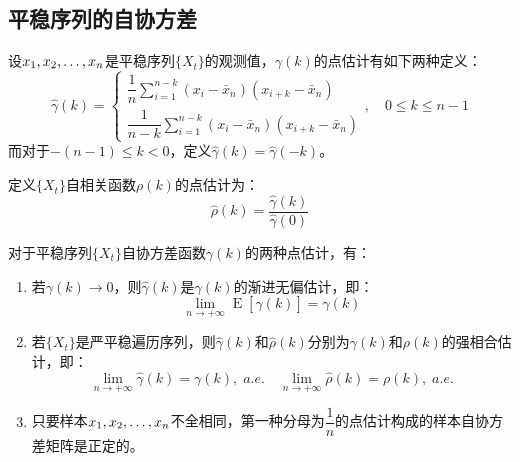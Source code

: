 \subsection{平稳序列的自协方差}
\begin{definition}
	设$x_1, x_2, \dots, x_{n}$是平稳序列$\{X_t\}$的观测值，$\gamma(k)$的点估计有如下两种定义：
	\begin{equation*}
		\hat{\gamma}(k)=
		\begin{cases}
			\dfrac{1}{n}\sum\limits_{i=1}^{n-k}(x_i-\bar{x}_n)(x_{i+k}-\bar{x}_n) \\
			\dfrac{1}{n-k}\sum\limits_{i=1}^{n-k}(x_i-\bar{x}_n)(x_{i+k}-\bar{x}_n)
		\end{cases},\quad 0\leqslant k\leqslant n-1
	\end{equation*}
	而对于$-(n-1)\leqslant k<0$，定义$\hat{\gamma}(k)=\hat{\gamma}(-k)$。\par
	定义$\{X_t\}$自相关函数$\rho(k)$的点估计为：
	\begin{equation*}
		\hat{\rho}(k)=\frac{\hat{\gamma}(k)}{\hat{\gamma}(0)}
	\end{equation*}
\end{definition}
\begin{theorem}\label{theo:StationarySeriesAutoCovariancePE}
	对于平稳序列$\{X_t\}$自协方差函数$\gamma(k)$的两种点估计，有：
	\begin{enumerate}
		\item 若$\gamma(k)\to0$，则$\hat{\gamma}(k)$是$\gamma(k)$的渐进无偏估计，即：
		\begin{equation*}
			\lim_{n\to+\infty}\operatorname{E}[\hat{\gamma}(k)]=\gamma(k)
		\end{equation*}
		\item 若$\{X_t\}$是严平稳遍历序列，则$\hat{\gamma}(k)$和$\hat{\rho}(k)$分别为$\gamma(k)$和$\rho(k)$的强相合估计，即：
		\begin{equation*}
			\lim_{n\to+\infty}\hat{\gamma}(k)=\gamma(k),\;a.e.\quad
			\lim_{n\to+\infty}\hat{\rho}(k)=\rho(k),\;a.e.
		\end{equation*}
		\item 只要样本$x_1, x_2, \dots, x_{n}$不全相同，第一种分母为$\dfrac{1}{n}$的点估计构成的样本自协方差矩阵是正定的。
	\end{enumerate}
\end{theorem}
